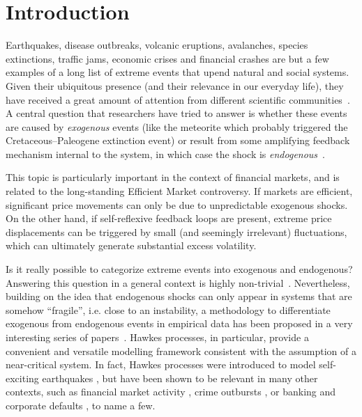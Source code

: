 \documentclass[amsmath,amssymb,aps,pre,floatfix,twocolumn,superscriptaddress]{revtex4}
\begin{document}
\section{Introduction}

Earthquakes, disease outbreaks, volcanic eruptions, avalanches, species extinctions, traffic jams, economic crises and financial crashes are but a few examples of a long list of extreme events that upend natural and social systems. Given their ubiquitous presence (and their relevance in our everyday life), they have received a great amount of attention from different scientific communities~\cite{bak_SOC_book,book_extreme_events,sornette_book_critical,taleb_book_black_sw}. A central question that researchers have tried to answer is whether these events are caused by  {\it exogenous} events (like the meteorite which probably triggered the Cretaceous–Paleogene extinction event) or result from some amplifying feedback mechanism internal to the system, in which case the shock is {\it endogenous}~\cite{sornette_chaper_endogenous}. 

This topic is particularly important in the context of financial markets, and is related to the long-standing Efficient Market controversy. If markets are efficient, significant price movements can only be due to unpredictable exogenous shocks. On the other hand, if self-reflexive feedback loops are present, extreme price displacements can be triggered by small (and seemingly irrelevant) fluctuations, which can ultimately generate substantial excess volatility. 

Is it really possible to categorize extreme events into exogenous and endogenous? Answering this question in a general context is highly non-trivial~\cite{sornette_chaper_endogenous}. Nevertheless, building on the idea that endogenous shocks can only appear in systems that are somehow ``fragile'', i.e. close to an instability, a methodology to differentiate exogenous from endogenous events in empirical data has been proposed in a very interesting series of papers~\cite{sornette2003endogenous}. 
Hawkes processes, in particular, provide a convenient and versatile modelling framework consistent with the assumption of a near-critical system. In fact, Hawkes processes were introduced to model self-exciting earthquakes \cite{hawkes_original,sornette_ETAS}, but have been shown to be relevant in many other contexts, such as financial market activity \cite{hawkes_mastromatteo}, crime outbursts \cite{mohler_hawkes}, or banking and corporate defaults \cite{lando_hawkes}, to name a few.
\end{document}
